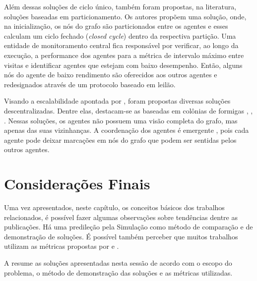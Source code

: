 Além dessas soluções de ciclo único, também foram propostas, na literatura, 
soluções baseadas em particionamento. Os autores 
\citep{Pippin:2013:PBT:2480362.2480378} propõem uma solução, onde, na 
inicialização, os nós do grafo são particionados entre os agentes e esses 
calculam um ciclo fechado (\textit{closed cycle}) dentro da respectiva partição. 
Uma entidade de monitoramento central fica responsável por verificar, ao longo 
da execução, a performance dos agentes para a métrica de intervalo máximo entre 
visitas e identificar agentes que estejam com baixo desempenho. Então, alguns 
nós do agente de baixo rendimento são oferecidos aos outros agentes e 
redesignados através de um protocolo baseado em leilão.

Visando a escalabilidade apontada por \citep{Almeida:2004:AAI}, foram propostas 
diversas soluções descentralizadas. Dentre elas, destacam-se as baseadas em 
colônias de formigas \citep{Koenig:2001:TCA:375735.376463}, 
\citep{Elor:2010:AMC:1884958.1884970}, \citep{6615158}. Nessas soluções, os 
agentes não possuem uma visão completa do grafo, mas apenas das suas 
vizinhanças. A coordenação dos agentes é emergente 
\citep{Machado:2002:MPE:1765317.1765332}, pois cada agente pode deixar marcações 
em nós do grafo que podem ser sentidas pelos outros agentes.

\section{Considerações Finais}

Uma vez apresentados, neste capítulo, os conceitos básicos dos trabalhos 
relacionados, é possível fazer algumas observações sobre tendências dentre as 
publicações. Há uma predileção pela Simulação como método de comparação e de 
demonstração de soluções. É possível também perceber que muitos trabalhos 
utilizam as métricas propostas por \citep{Machado:2002:MPE:1765317.1765332} e 
\citep{sampaiophd}.

A  resume as soluções apresentadas nesta sessão de 
acordo com o escopo do problema, o método de demonstração das soluções e as 
métricas utilizadas.

